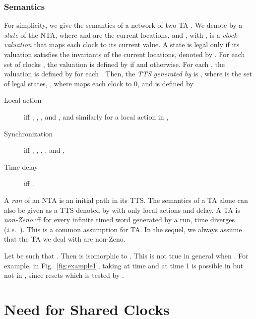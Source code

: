 \documentclass{LMCS}
\theoremstyle{plain}\newtheorem*{prop11}{Proposition~\ref{prop:states} bis}
\def\ie{{\em i.e.\ }}
\begin{document}
\subsubsection*{Semantics} For simplicity, we give the semantics of a network of two TA
. We denote by  a \emph{state} of
the NTA, where   and  are the current locations, and
, with , is a \emph{clock valuation}
that maps each clock to its current value. A state is legal only if its
valuation  satisfies the invariants of the current locations, denoted by
.
For each set of clocks , the valuation  is defined by
 if  and  otherwise.
For each , the valuation  is
defined by  for each .
Then,
the \emph{TTS generated by } is
,
where
 is the set of legal states,
, where  maps each clock to 0,
and  is defined by
\begin{description}
  \item[Local action]
   iff
  ,
  ,
  ,  and , and similarly
  for a local action in ,
  \item[Synchronization]
   iff ,
  , \mbox{},
  ,  and
  ,
  \item[Time delay]  iff
  .
\end{description}

A \emph{run} of an NTA  is an initial path in its TTS.
The semantics of a TA  alone can also be given as a TTS denoted by
 with only local actions and delay.
A TA is \emph{non-Zeno} iff for every infinite timed word  generated by a
run, time diverges (\ie ).
This is a common assumption for TA\@. In the sequel,
we always assume that the TA we deal with are non-Zeno.


\begin{rem}\label{rem:disjoint_clocksets}
  Let  be such that . Then
   is isomorphic to .
  This is not true in general when .
  For example, in Fig.~\ref{fig:example1}, taking  at time  and
   at time 1 is possible in  but not in
  , since  resets  which is tested by
  .
\end{rem}






\section{Need for Shared Clocks}
\label{sec:nsc_problem_setting}
\end{document}
